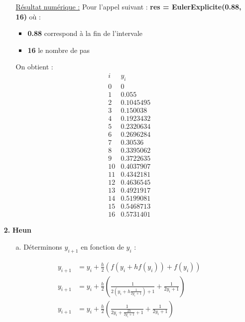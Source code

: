 \documentclass[12pt, letterpaper]{article}
\begin{document}
\begin{enumerate}
\begin{enumerate}
  \underline{Résultat numérique :} \newline
  Pour l'appel suivant :\newline
  \textbf{res = EulerExplicite(0.88, 16)}
  où :
  \begin{itemize}
  \item \textbf{0.88} correspond à la fin de l'intervale
  \item \textbf{16} le nombre de pas
  \end{itemize}
  On obtient :
  \begin{equation*}
    \begin{array}{ll}
      i & y_i\\
      0 & 0 \\
      1 & 0.055   \\ 
      2 & 0.1045495\\
      3 & 0.150038 \\
      4 & 0.1923432\\
      5 & 0.2320634\\
      6 & 0.2696284\\
      7 & 0.30536  \\
      8 & 0.3395062\\
      9 & 0.3722635\\
      10 & 0.4037907\\
      11 & 0.4342181\\
      12 & 0.4636545\\
      13 & 0.4921917\\
      14 & 0.5199081\\
      15 & 0.5468713\\
      16 & 0.5731401
    \end{array}
  \end{equation*}
  
\end{enumerate}

\item[\textbf{2.}] \textbf{Heun}

\begin{enumerate}

\item[a.] Déterminons $y_{i+1}$ en fonction de $y_i$ :

  \begin{equation*}
    \begin{split}
      y_{i+1} & = y_i + \frac{h}{2} (f(y_i + h f(y_i)) + f(y_i)) \\
      y_{i+1} & = y_i + \frac{h}{2} \left(\frac{1}{2 \left(y_i + h \frac{1}{2y_i
          + 1}\right) + 1} + \frac{1}{2y_i + 1}\right) \\
      y_{i+1} & = y_i + \frac{h}{2} \left(\frac{1}{2y_i + \frac{2h}{2y_i
          + 1} + 1} + \frac{1}{2y_i + 1}\right)
    \end{split}
  \end{equation*}


\end{enumerate}
\end{enumerate}
\end{document}
